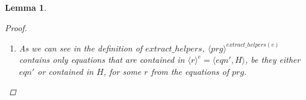 \documentclass[11pt]{article} %
\newtheorem{lemma}{Lemma}
\begin{document}
\begin{lemma}
\begin{proof}
\begin{enumerate}
\begin{proof}[Proof for Kind `B']
\begin{itemize}
\end{itemize}

\end{proof}

\item As we can see in the definition of $extract\_helpers$, $\langle prg \rangle^{extract\_helpers(e)}$ contains only equations that are contained in $\langle r \rangle^{e} = \big\langle eqn', H \big\rangle$, be they either $eqn'$ or contained in $H$, for some $r$ from the equations of $prg$.

\end{enumerate}

\end{proof}

\end{lemma}

%
%
%
%
\end{document}

